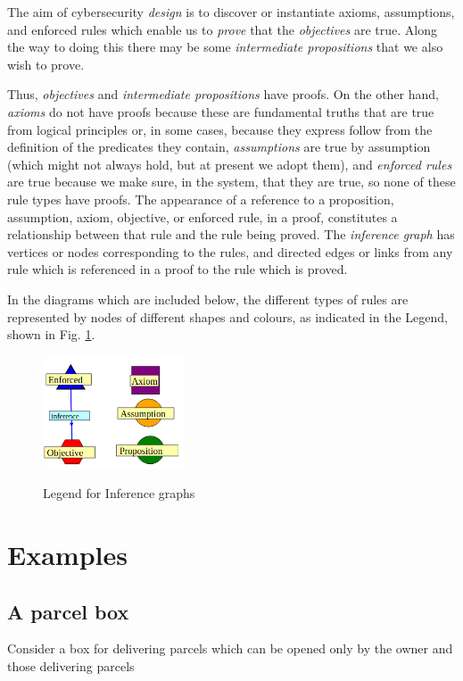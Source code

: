 The aim of cybersecurity {\em design} is to discover or instantiate axioms,
assumptions, and enforced rules which enable us to {\em prove} that
the {\em objectives} are true. Along the way to doing this there may
be some {\em intermediate propositions} that we also wish to prove.

Thus, {\em objectives} and {\em intermediate propositions} have proofs.
On the other hand, {\em axioms} do not have proofs because these are
fundamental truths that are true from logical principles
or, in some cases, because they express follow from the definition 
of the predicates they contain, {\em assumptions}
are true by assumption (which might not always hold, but at present
we adopt them), and {\em enforced rules} are true because we make sure,
in the system, that they are true, so none of these rule types
have proofs.
The appearance of a reference to a
proposition, assumption, axiom, objective, or enforced
rule, in a proof,  constitutes a relationship between that rule
and the rule being proved. The {\em inference graph} has vertices or
nodes corresponding to the rules, and directed edges or links from any
rule which is referenced in a proof to the rule which is proved.


In the diagrams which are included below, the different types of rules
are represented by nodes of different shapes and colours, as 
indicated in the Legend, shown in Fig. \ref{legend}.
\begin{figure}[bhpt]
	\centering
		\leavevmode\includegraphics[width=42mm]{figures/legend.png}\ \\
		\caption{Legend for Inference graphs}\label{legend}
\end{figure}

\section{Examples}\label{examplesec}

\subsection{A parcel box}

Consider a box for delivering parcels which can be opened only by the owner and those delivering parcels

